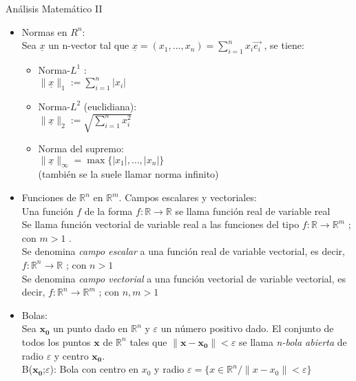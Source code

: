 \documentclass[a4paper, 12pt]{article}
\begin{document}
Análisis Matemático II \\


\begin{itemize}
\item Normas en $R^n$:\\
Sea $\underline{x}$ un n-vector tal que $\underline{x}=(x_1 ,\dots , x_n)=\displaystyle \sum_{i=1}^n x_{i} \vec{e_i}$ , se tiene:  \\
\begin{itemize}
\item Norma-$L^1$  : \\[6pt]
$\|\underline{x}\|_1 := \displaystyle \sum_{i=1}^n |x_i|$\\
\item Norma-$L^2$ (euclidiana):\\[6pt]
$\|\underline{x}\|_2 := \sqrt{\displaystyle \sum_{i=1}^n x_i^2}$\\
\item Norma del supremo:\\[6pt]
$\|\underline{x}\|_{\infty} = \max{ \{ |x_1|, \dots , |x_n| \} }$\\[6pt]
(también se la suele llamar norma infinito)
\end{itemize}
\item Funciones de $\mathbb{R}^n$ en $\mathbb{R}^m$. Campos escalares y vectoriales: \\
Una función $f$ de la forma $f: \mathbb{R} \to \mathbb{R}$ se llama función real de variable real \\
Se llama  función vectorial de variable real a las funciones del tipo $f: \mathbb{R} \to \mathbb{R}^m$ ; con $m>1$ .\\
Se denomina \emph{campo escalar} a una función real de variable vectorial, es decir, $f: \mathbb{R}^n \to \mathbb{R}$ ; con $n>1$ \\
Se denomina \emph{campo vectorial} a una función vectorial de variable vectorial, es decir, $f: \mathbb{R}^n \to \mathbb{R}^m$ ; con $n,m>1$ \\

\item Bolas: \\
Sea $\mathbf{x_0}$ un punto dado en $\mathbb{R}^n$ y $\varepsilon$ un número positivo dado. El conjunto de todos los puntos $\mathbf{x}$ de $\mathbb{R}^n$ tales que $\| \mathbf{x - x_0}\| < \varepsilon$ se llama \emph{n-bola abierta} de radio $\varepsilon$ y centro $\mathbf{x_0}$. \\
B($\mathbf{x_0}$;$\varepsilon$): Bola con centro en $x_0$ y radio $\varepsilon = \{ x \in \mathbb{R}^n / \| x-x_0 \| < \varepsilon \}$\\


\end{itemize}
\end{document}
